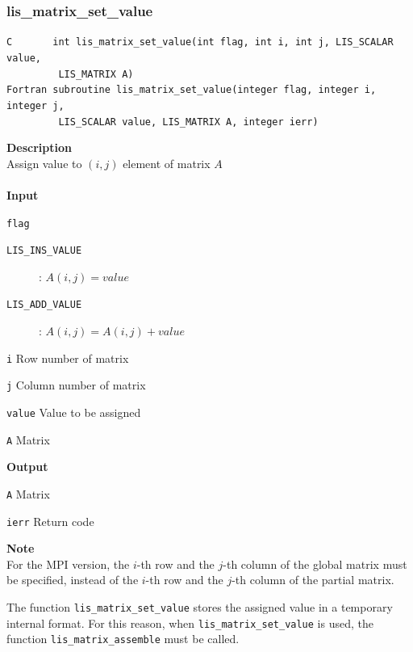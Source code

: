 \documentclass[a4paper]{article}
\newcommand{\namelistlabel}[1]{\mbox{#1}\hfill}
\newenvironment{namelist}[1]{%
 \begin{list}{}
  {\let\makelabel\namelistlabel
  \settowidth{\labelwidth}{#1}
  \setlength{\leftmargin}{1.1\labelwidth}}
}{%
\end{list}}
\begin{document}
  \subsubsection{lis\_matrix\_set\_value}
\begin{screen}
\verb|C       int lis_matrix_set_value(int flag, int i, int j, LIS_SCALAR value,|\\
\verb|         LIS_MATRIX A)|\\
\verb|Fortran subroutine lis_matrix_set_value(integer flag, integer i, integer j,|\\
\verb|         LIS_SCALAR value, LIS_MATRIX A, integer ierr)|
\end{screen}
{\bf Description}\\
\indent
Assign value to $(i, j)$ element of matrix $A$
\\ \\
\noindent
{\bf Input}
\begin{namelist}{XXXXXXXXXXXXXXXXXXXX}
\item[\tt flag] \begin{description}
\item[\tt LIS\_INS\_VALUE]: $A(i,j) = value$
\item[\tt LIS\_ADD\_VALUE]: $A(i,j) = A(i,j) + value$
\end{description}
\item[\tt i] Row number of matrix
\item[\tt j] Column number of matrix
\item[\tt value] Value to be assigned
\item[\tt A] Matrix
\end{namelist}
{\bf Output}
\begin{namelist}{XXXXXXXXXXXXXXXXXXXX}
\item[\tt A] Matrix 
\item[\tt ierr] Return code
\end{namelist}
\noindent
{\bf Note}\\
\indent
For the MPI version, the $i$-th row and the $j$-th column of the global matrix must 
be specified, instead of the $i$-th row and the $j$-th column of the partial matrix. 

The function \verb|lis_matrix_set_value| stores the assigned value in a temporary internal format. 
For this reason, when \verb|lis_matrix_set_value| is used, 
the function \verb|lis_matrix_assemble| must be called. 
\end{document}
